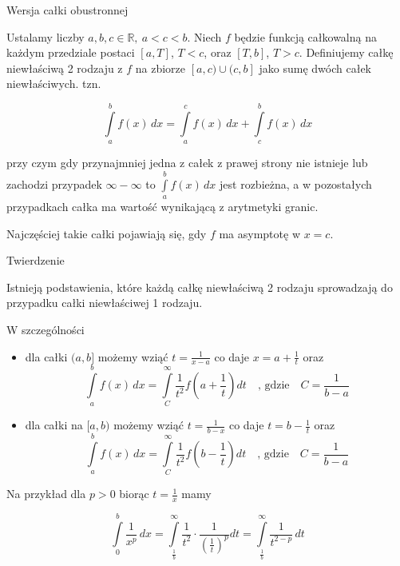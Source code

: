 \begin{tw}{Wersja całki obustronnej}

Ustalamy liczby $ a,b,c \in \mathbb{R}, \ a < c < b $. Niech $f$ będzie funkcją całkowalną na każdym przedziale postaci
$[a,T]$, $T < c$, oraz $ [T, b] $, $ T > c $. Definiujemy całkę niewłaściwą 2 rodzaju z $f$ na zbiorze $[a, c)\cup(c, b] $
jako sumę dwóch całek niewłaściwych. tzn.

\[ \int\limits_{a}^{b} f(x) \,dx = \int\limits_{a}^{c} f(x) \,dx + \int\limits_{c}^{b} f(x) \,dx \]

przy czym gdy przynajmniej jedna z całek z prawej strony nie istnieje lub zachodzi przypadek $ \infty - \infty $ to
$ \int\limits_{a}^{b} f(x) \,dx $ jest rozbieżna, a w pozostałych przypadkach całka ma wartość wynikającą z arytmetyki granic.
\end{tw}

Najczęściej takie całki pojawiają się, gdy $f$ ma asymptotę w $x = c$. \\

\begin{tw}{Twierdzenie}

Istnieją podstawienia, które każdą całkę niewłaściwą 2 rodzaju sprowadzają do przypadku całki niewłaściwej 1 rodzaju.

W szczególności

\begin{itemize}
    \item dla całki $(a,b]$ możemy wziąć $ t = \frac{1}{x - a} $ co daje $ x = a + \frac{1}{t} $ oraz
    $$ \int\limits_{a}^{b} f(x) \,dx = \int\limits_{C}^{\infty} \frac{1}{t^2} f \left(a + \frac{1}{t} \right) dt \quad
    \textrm{, gdzie} \quad C = \frac{1}{b - a} $$

    \item dla całki na $[a,b)$ możemy wziąć $t = \frac{1}{b - x}$ co daje $ t = b - \frac{1}{t} $ oraz
    $$ \int\limits_{a}^{b} f(x) \,dx = \int\limits_{C}^{\infty} \frac{1}{t^2} f \left(b - \frac{1}{t} \right) dt \quad
    \textrm{, gdzie} \quad C = \frac{1}{b - a} $$
\end{itemize}
\end{tw}

Na przykład dla $ p > 0 $ biorąc $ t = \frac{1}{x} $ mamy 

$$ \int\limits_{0}^{b} \frac{1}{x^p} \,dx = \int\limits_{\frac{1}{b}}^{\infty} \frac{1}{t^2} \cdot \frac{1}{ \left( \frac{1}{t} \right)^p } dt
= \int\limits_{\frac{1}{b}}^{\infty} \frac{1}{t^{2 - p}} \,dt $$

